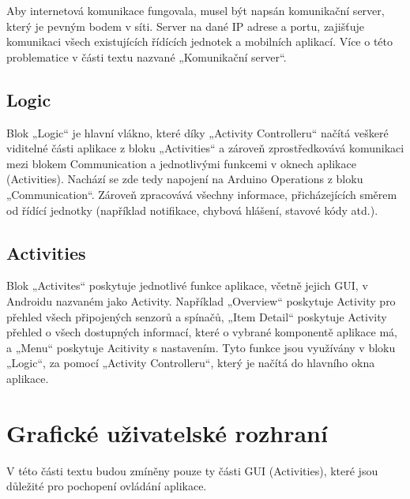 \documentclass[FM,DP]{tulthesis}  %
\begin{document}
Aby internetová komunikace fungovala, musel být napsán komunikační server, který je pevným bodem v síti. Server na dané IP adrese a portu, zajišťuje komunikaci všech existujících řídících jednotek a mobilních aplikací. Více o této problematice v části textu nazvané „Komunikační server“.

\subsection{Logic}
Blok „Logic“ je hlavní vlákno, které díky „Activity Controlleru“ načítá veškeré viditelné části aplikace z bloku „Activities“ a zároveň zprostředkovává komunikaci mezi blokem Communication a jednotlivými funkcemi v oknech aplikace (Activities). Nachází se zde tedy napojení na Arduino Operations z bloku „Communication“. Zároveň zpracovává všechny informace, přicházejících směrem od řídící jednotky (například notifikace, chybová hlášení, stavové kódy atd.).

\subsection{Activities}
Blok „Activites“ poskytuje jednotlivé funkce aplikace, včetně jejich GUI, v Androidu nazvaném jako Activity. Například „Overview“ poskytuje Activity pro přehled všech připojených senzorů a spínačů, „Item Detail“ poskytuje Activity přehled o všech dostupných informací, které o vybrané komponentě aplikace má, a „Menu“ poskytuje Acitivity s nastavením. Tyto funkce jsou využívány v bloku „Logic“, za pomocí „Activity Controlleru“, který je načítá do hlavního okna aplikace.

\section{Grafické uživatelské rozhraní}
V této části textu budou zmíněny pouze ty části GUI (Activities), které jsou důležité pro pochopení ovládání aplikace.
\end{document}

